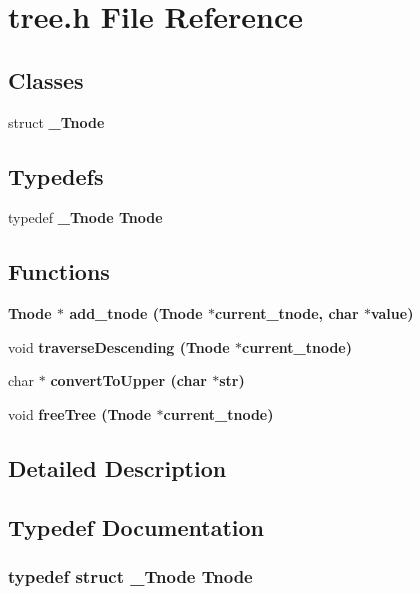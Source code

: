 \section{tree.h File Reference}
\label{tree_8h}
\subsection*{Classes}
\begin{CompactItemize}
\item 
struct \bf{\_\-Tnode}
\end{CompactItemize}
\subsection*{Typedefs}
\begin{CompactItemize}
\item 
typedef \bf{\_\-Tnode} \bf{Tnode}
\end{CompactItemize}
\subsection*{Functions}
\begin{CompactItemize}
\item 
\bf{Tnode} $\ast$ \bf{add\_\-tnode} (\bf{Tnode} $\ast$current\_\-tnode, char $\ast$value)
\item 
void \bf{traverse\-Descending} (\bf{Tnode} $\ast$current\_\-tnode)
\item 
char $\ast$ \bf{convert\-To\-Upper} (char $\ast$str)
\item 
void \bf{free\-Tree} (\bf{Tnode} $\ast$current\_\-tnode)
\end{CompactItemize}


\subsection{Detailed Description}


\subsection{Typedef Documentation}
\subsubsection{\setlength{\rightskip}{0pt plus 5cm}typedef struct \bf{\_\-Tnode} \bf{Tnode}}\label{tree_8h_9242298e266f76511e0cfefa23a99572}




